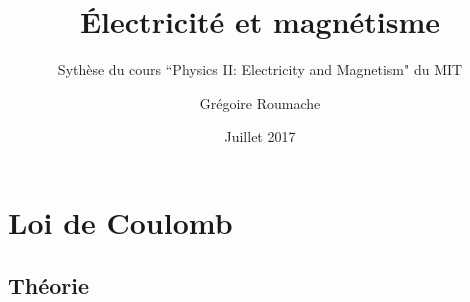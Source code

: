 \documentclass[a4paper]{article}
\title{Électricité et magnétisme}
\subtitle{Sythèse du cours \textquotedblleft Physics II: Electricity and Magnetism" du MIT}
\author{Grégoire Roumache}
\date{Juillet 2017}
\begin{document}
\maketitle

































\section{Loi de Coulomb}











\subsection{Théorie}
\end{document}
